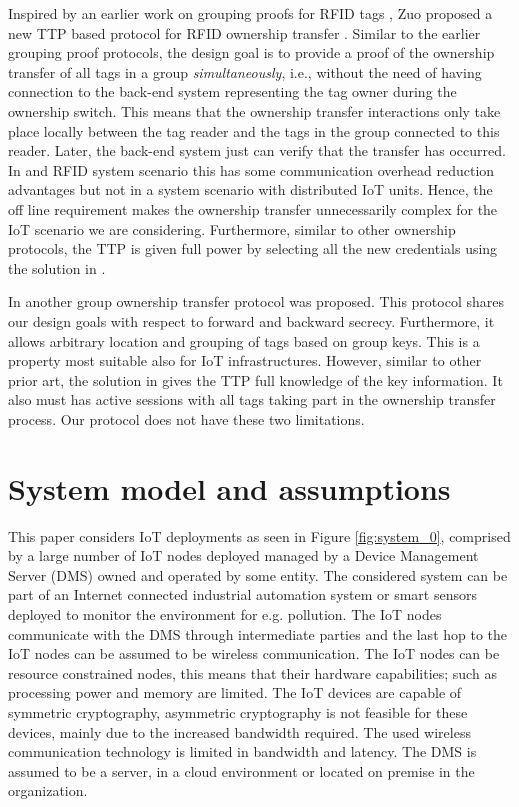 {Inspired by an earlier work on grouping proofs for RFID tags \cite{Burmeister2008}, Zuo proposed a new TTP based protocol for RFID ownership transfer \cite{zuo2010changing}. Similar to the earlier grouping proof protocols, the design goal is to provide a proof of the ownership transfer of all tags in a group {\em simultaneously}, i.e., without the need of having connection to the back-end system representing the tag owner during the ownership switch. This means that the ownership transfer interactions only take place locally between the tag reader and the tags in the group connected to this reader. Later, the back-end system just can verify that the transfer has occurred. In and RFID system scenario this has some communication overhead reduction advantages but not in a system scenario with distributed IoT units.  Hence, the off line requirement makes the ownership transfer unnecessarily complex for the IoT scenario we are considering. Furthermore, similar to other ownership protocols, the TTP is given full power by selecting all the new credentials using the solution in \cite{zuo2010changing}. 

In \cite{He2014} another group ownership transfer protocol was proposed. This protocol shares our design goals with respect to forward and backward secrecy. Furthermore, it allows arbitrary location and grouping of tags based on group keys. This is a property most suitable also for IoT infrastructures. However, similar to other prior art, the solution in \cite{He2014} gives the TTP full knowledge of the key information. It also must has active sessions with all tags taking part in the ownership transfer process. Our protocol does not have these two limitations.

\section{System model and assumptions}
\label{System}

This paper considers IoT deployments as seen in Figure \ref{fig:system_0}, comprised by a large number of IoT nodes deployed  managed by a Device Management Server (DMS) owned and operated by some entity. The considered system can be part of an Internet connected industrial automation system or smart sensors deployed to monitor the environment for e.g. pollution. The IoT nodes communicate with the DMS through intermediate parties and the last hop to the IoT nodes can be assumed to be wireless communication. The IoT nodes can be resource constrained nodes, this means that their hardware capabilities; such as processing power and memory are limited. The IoT devices are capable of symmetric cryptography, asymmetric cryptography is not feasible for these devices, mainly due to the increased bandwidth required. The used wireless communication technology is limited in bandwidth and latency. The DMS is assumed to be a server, in a cloud environment or located on premise in the organization. 

}

